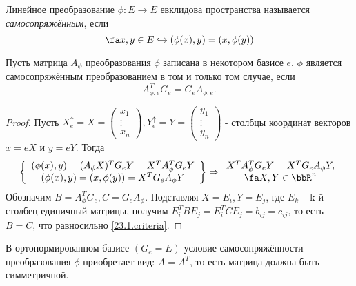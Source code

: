\begin{defn}
  Линейное преобразование $\phi: E \rightarrow E$ евклидова пространства называется \textit{самосопряжённым}, если
  \begin{equation}\label{23.1.selfadjoint}
  \fa x,y \in E \hookrightarrow (\phi(x),y)=(x,\phi(y))
  \end{equation}
\end{defn}
  \begin{thm} Пусть матрица $A_\phi$ преобразования $\phi$ записана в некотором базисе $e$. $\phi$ является самосопряжённым преобразованием в том и только том случае, если
  \begin{equation}\label{23.1.criteria}
  A^T_{\phi,e}G_e=G_eA_{\phi,e}.
  \end{equation}  
  \end{thm}    
  \begin{proof}
  Пусть $X_e^\uparrow=X=
  \begin{pmatrix}
  x_1 \\ \vdots \\ x_n
  \end{pmatrix},Y_e^\uparrow=Y=
  \begin{pmatrix}
  y_1 \\ \vdots \\ y_n
  \end{pmatrix}$ - столбцы координат векторов $x=eX$ и $y=eY$. Тогда
  \begin{equation*}
  \left\lbrace \begin{array}{crl}
    (\phi(x),y)=(A_\phi X)^TG_eY=X^TA_\phi^TG_eY \\
    (\phi(x),y)=(x,\phi(y))=X^TG_eA_\phi Y \\
    \end{array}\right\rbrace \Rightarrow  \begin{array}{crl}
    X^TA_\phi^TG_eY=X^TG_eA_\phi Y, \\ \fa X,Y\in \bbR^n
  \end{array}     
  \end{equation*}   
  Обозначим $B=A_\phi^TG_e, C=G_eA_\phi$. Подставляя $X=E_i, Y=E_j$, где $E_k$ -- k-й столбец единичный матрицы, получим $E_i^TBE_j=E_i^TCE_j=b_{ij}=c_{ij}$, то есть $B=C$, что равносильно \ref{23.1.criteria}.
  \end{proof}
  \begin{cons}
  В ортонормированном базисе $(G_e=E)$ условие самосопряжённости преобразования $\phi$ приобретает вид: $A=A^T$, то есть матрица должна быть симметричной.
  \end{cons}

